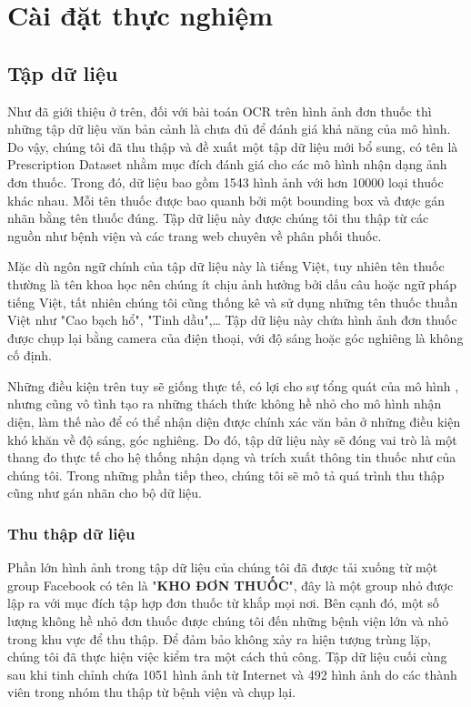 \chapter{Cài đặt thực nghiệm}
\label{Chapter4}

\section{Tập dữ liệu}

Như đã giới thiệu ở trên, đối với bài toán OCR trên hình ảnh đơn thuốc thì những tập dữ liệu văn bản cảnh là chưa đủ để đánh giá khả năng của mô hình. Do vậy, chúng tôi đã thu thập và đề xuất một tập dữ liệu mới bổ sung, có tên là Prescription Dataset nhằm mục đích đánh giá cho các mô hình nhận dạng ảnh đơn thuốc. Trong đó, dữ liệu bao gồm 1543 hình ảnh với hơn 10000 loại thuốc khác nhau. Mỗi tên thuốc được bao quanh bởi một bounding box và được gán nhãn bằng tên thuốc đúng. Tập dữ liệu này được chúng tôi thu thập từ các nguồn như bệnh viện và các trang web chuyên về phân phối thuốc.

Mặc dù ngôn ngữ chính của tập dữ liệu này là tiếng Việt, tuy nhiên tên thuốc thường là tên khoa học nên chúng ít chịu ảnh hưởng bởi dấu câu hoặc ngữ pháp tiếng Việt, tất nhiên chúng tôi cũng thống kê và sử dụng những tên thuốc thuần Việt như "Cao bạch hổ", "Tinh dầu",… Tập dữ liệu này chứa hình ảnh đơn thuốc được chụp lại bằng camera của điện thoại, với độ sáng hoặc góc nghiêng là không cố định.

Những điều kiện trên tuy sẽ giống thực tế, có lợi cho sự tổng quát của mô hình , nhưng cũng vô tình tạo ra những thách thức không hề nhỏ cho mô hình nhận diện, làm thế nào để có thể nhận diện được chính xác văn bản ở những điều kiện khó khăn về độ sáng, góc nghiêng. Do đó, tập dữ liệu này sẽ đóng vai trò là một thang đo thực tế cho hệ thống nhận dạng và trích xuất thông tin thuốc như của chúng tôi. Trong những phần tiếp theo, chúng tôi sẽ mô tả quá trình thu thập cũng như gán nhãn cho bộ dữ liệu.

\subsection{Thu thập dữ liệu}
Phần lớn hình ảnh trong tập dữ liệu của chúng tôi đã được tải xuống từ một group
Facebook có tên là "\textbf{KHO ĐƠN THUỐC}", đây là một group nhỏ được lập ra với mục đích tập
hợp đơn thuốc từ khắp mọi nơi. Bên cạnh đó, một số lượng không hề nhỏ đơn thuốc được
chúng tôi đến những bệnh viện lớn và nhỏ trong khu vực để thu thập. Để đảm bảo không xảy ra hiện tượng trùng lặp, chúng tôi đã thực hiện việc kiểm tra một cách thủ công. Tập dữ
liệu cuối cùng sau khi tinh chỉnh chứa 1051 hình ảnh từ Internet và 492 hình ảnh do các thành viên trong nhóm thu thập từ bệnh viện và chụp lại.
